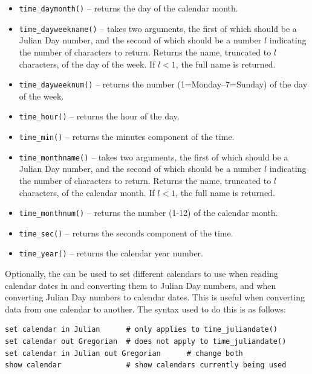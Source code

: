 \begin{itemize}
\item {\tt time\_daymonth()}     -- returns the day of the calendar month.
\item {\tt time\_dayweekname()}  -- takes two arguments, the first of which should be a Julian Day number, and the second of which should be a number $l$ indicating the number of characters to return. Returns the name, truncated to $l$ characters, of the day of the week. If $l<1$, the full name is returned.
\item {\tt time\_dayweeknum()}   -- returns the number (1=Monday--7=Sunday) of the day of the week.
\item {\tt time\_hour()}         -- returns the hour of the day.
\item {\tt time\_min()}          -- returns the minutes component of the time.
\item {\tt time\_monthname()}    -- takes two arguments, the first of which should be a Julian Day number, and the second of which should be a number $l$ indicating the number of characters to return. Returns the name, truncated to $l$ characters, of the calendar month. If $l<1$, the full name is returned.
\item {\tt time\_monthnum()}     -- returns the number (1-12) of the calendar month.
\item {\tt time\_sec()}          -- returns the seconds component of the time.
\item {\tt time\_year()}         -- returns the calendar year number.
\end{itemize}

Optionally, the  can be used to set different calendars
to use when reading calendar dates in and converting them to Julian Day
numbers, and when converting Julian Day numbers to calendar dates. This is
useful when converting data from one calendar to another. The syntax used to do
this is as follows:
\begin{verbatim}
set calendar in Julian      # only applies to time_juliandate()
set calendar out Gregorian  # does not apply to time_juliandate()
set calendar in Julian out Gregorian      # change both
show calendar               # show calendars currently being used
\end{verbatim}


